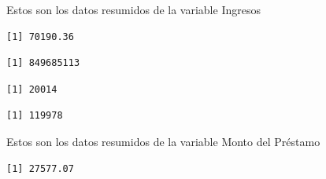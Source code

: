 \documentclass[
  letterpaper,
  DIV=11,
  numbers=noendperiod]{scrreprt}
\newenvironment{Shaded}{\begin{snugshade}}{\end{snugshade}}
\newcommand{\NormalTok}[1]{\textcolor[rgb]{0.00,0.23,0.31}{#1}}
\newcommand{\SpecialCharTok}[1]{\textcolor[rgb]{0.37,0.37,0.37}{#1}}
\begin{document}
Estos son los datos resumidos de la variable Ingresos

\begin{Shaded}
\end{Shaded}

\begin{verbatim}
[1] 70190.36
\end{verbatim}

\begin{Shaded}
\end{Shaded}

\begin{verbatim}
[1] 849685113
\end{verbatim}

\begin{Shaded}
\end{Shaded}

\begin{verbatim}
[1] 20014
\end{verbatim}

\begin{Shaded}
\end{Shaded}

\begin{verbatim}
[1] 119978
\end{verbatim}

Estos son los datos resumidos de la variable Monto del Préstamo

\begin{Shaded}
\end{Shaded}

\begin{verbatim}
[1] 27577.07
\end{verbatim}
\end{document}
